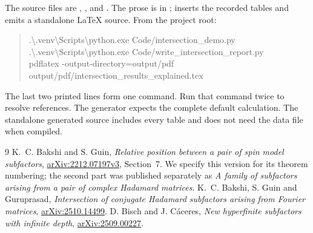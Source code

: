 \documentclass[11pt]{article}
\theoremstyle{definition}
\theoremstyle{remark}
\begin{document}
The source files are ,
, and
.
The prose is in ;
 inserts the recorded tables
and emits a standalone \LaTeX{} source. From the project root:
\begin{quote}\small\ttfamily
.\textbackslash.venv\textbackslash Scripts\textbackslash python.exe Code/intersection\_demo.py\\
.\textbackslash.venv\textbackslash Scripts\textbackslash python.exe Code/write\_intersection\_report.py\\
pdflatex -output-directory=output/pdf\\
\hspace*{1em}output/pdf/intersection\_results\_explained.tex
\end{quote}
The last two printed lines form one command. Run that command twice
to resolve references. The generator expects the complete default
calculation. The standalone generated source includes every table
and does not need the data file when compiled.

\begin{thebibliography}{9}
K.~C. Bakshi and S. Guin,
\emph{Relative position between a pair of spin model subfactors},
\href{https://arxiv.org/html/2212.07197v3}{arXiv:2212.07197v3},
Section~7. We specify this version for its theorem numbering;
the second part was published separately as
\emph{A family of subfactors arising from a pair of complex Hadamard matrices}.
K.~C. Bakshi, S. Guin and Guruprasad,
\emph{Intersection of conjugate Hadamard subfactors arising from Fourier matrices},
\href{https://arxiv.org/abs/2510.14499}{arXiv:2510.14499}.
D. Bisch and J. C\'aceres,
\emph{New hyperfinite subfactors with infinite depth},
\href{https://arxiv.org/abs/2509.00227}{arXiv:2509.00227}.
\end{thebibliography}
\end{document}
